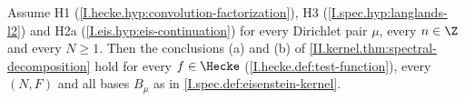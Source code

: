 Assume H1 (\cref{I.hecke.hyp:convolution-factorization}), H3 (\cref{I.spec.hyp:langlands-l2}) and H2a (\cref{I.eis.hyp:eis-continuation}) for every Dirichlet
pair $\mu$, every $n\in\Z$ and every $N\ge1$. Then the conclusions (a) and (b) of \cref{II.kernel.thm:spectral-decomposition} hold for every $f\in\Hecke$
(\cref{I.hecke.def:test-function}), every $(N,F)$ and all bases $B_\mu$ as in \cref{I.spec.def:eisenstein-kernel}.
